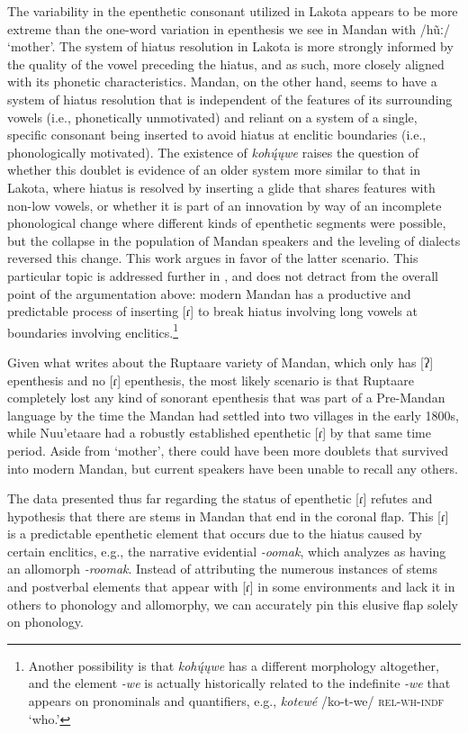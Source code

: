The variability in the epenthetic consonant utilized in Lakota appears to be more extreme than the one-word variation in epenthesis we see in Mandan with /hũː/ `mother'. The system of hiatus resolution in Lakota is more strongly informed by the quality of the vowel preceding the hiatus, and as such, more closely aligned with its phonetic characteristics. Mandan, on the other hand, seems to have a system of hiatus resolution that is independent of the features of its surrounding vowels (i.e., phonetically unmotivated) and reliant on a system of a single, specific consonant being inserted to avoid hiatus at enclitic boundaries (i.e., phonologically motivated). The existence of \textit{kohų́ųwe} raises the question of whether this doublet is evidence of an older system more similar to that in Lakota, where hiatus is resolved by inserting a glide that shares features with non-low vowels, or whether it is part of an innovation by way of an incomplete phonological change where different kinds of epenthetic segments were possible, but the collapse in the population of Mandan speakers and the leveling of dialects reversed this change. This work argues in favor of the latter scenario. This particular topic is addressed further in , and does not detract from the overall point of the argumentation above: modern Mandan has a productive and predictable process of inserting [ɾ] to break hiatus involving long vowels at boundaries involving enclitics.\footnote{Another possibility is that \textit{kohų́ųwe} has a different morphology altogether, and the element \textit{-we} is actually historically related to the indefinite \textit{-we} that appears on pronominals and quantifiers, e.g., \textit{kotewé} /ko-t-we/ \textsc{rel-wh-indf} `who.'}

Given what \citet{maximilian1839} writes about the Ruptaare variety of Mandan, which only has [ʔ] epenthesis and no [ɾ] epenthesis, the most likely scenario is that Ruptaare completely lost any kind of sonorant epenthesis that was part of a Pre-Mandan language by the time the Mandan had settled into two villages in the early 1800s, while Nuu'etaare had a robustly established epenthetic [ɾ] by that same time period. Aside from `mother', there could have been more doublets that survived into modern Mandan, but current speakers have been unable to recall any others.

The data presented thus far regarding the status of epenthetic [ɾ] refutes \citet{hollow1970} and  hypothesis that there are stems in Mandan that end in the coronal flap. This [ɾ] is a predictable epenthetic element that occurs due to the hiatus caused by certain enclitics, e.g., the narrative evidential \textit{-oomak}, which \citet{hollow1970} analyzes as having an allomorph \textit{-roomak}. Instead of attributing the numerous instances of stems and postverbal elements that appear with [ɾ] in some environments and lack it in others to phonology and allomorphy, we can accurately pin this elusive flap solely on phonology.

